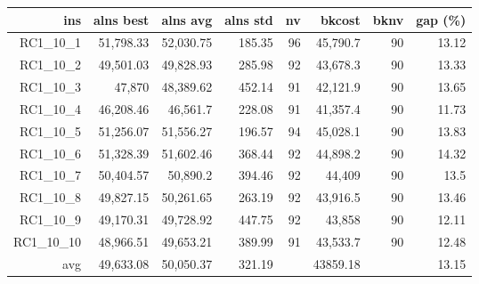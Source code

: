   \begin{table}[caption={Kết quả đo với tập HG\_RC\_1\_10 1000 yêu cầu}, label=exp:HGRC110]
    \small
    \centering
    \begin{tabular}{rrrrrrrr}
    \hline
    ins & alns best & alns avg & alns std & nv & bkcost & bknv & gap (\%) \\ \hline
    RC1\_10\_1 & 51,798.33 & 52,030.75 & 185.35 & 96 & 45,790.7 & 90 & 13.12 \\ \hline
    RC1\_10\_2 & 49,501.03 & 49,828.93 & 285.98 & 92 & 43,678.3 & 90 & 13.33 \\ \hline
    RC1\_10\_3 & 47,870 & 48,389.62 & 452.14 & 91 & 42,121.9 & 90 & 13.65 \\ \hline
    RC1\_10\_4 & 46,208.46 & 46,561.7 & 228.08 & 91 & 41,357.4 & 90 & 11.73 \\ \hline
    RC1\_10\_5 & 51,256.07 & 51,556.27 & 196.57 & 94 & 45,028.1 & 90 & 13.83 \\ \hline
    RC1\_10\_6 & 51,328.39 & 51,602.46 & 368.44 & 92 & 44,898.2 & 90 & 14.32 \\ \hline
    RC1\_10\_7 & 50,404.57 & 50,890.2 & 394.46 & 92 & 44,409 & 90 & 13.5 \\ \hline
    RC1\_10\_8 & 49,827.15 & 50,261.65 & 263.19 & 92 & 43,916.5 & 90 & 13.46 \\ \hline
    RC1\_10\_9 & 49,170.31 & 49,728.92 & 447.75 & 92 & 43,858 & 90 & 12.11 \\ \hline
    RC1\_10\_10 & 48,966.51 & 49,653.21 & 389.99 & 91 & 43,533.7 & 90 & 12.48 \\ \hline
    avg & 49,633.08 & 50,050.37 & 321.19 & & 43859.18 & & 13.15 \\ \hline
    \end{tabular}
  \end{table}